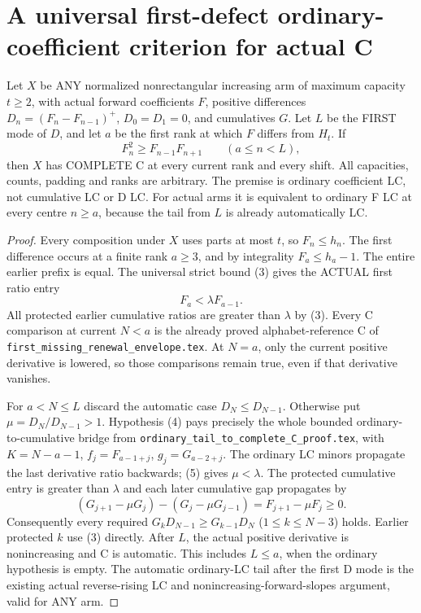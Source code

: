\section{A universal first-defect ordinary-coefficient criterion for actual C}
\begin{theorem}
Let $X$ be ANY normalized nonrectangular increasing arm of maximum
capacity $t\ge2$, with actual forward coefficients $F$, positive
differences $D_n=(F_n-F_{n-1})^+$, $D_0=D_1=0$, and cumulatives
$G$. Let $L$ be the FIRST mode of $D$, and let $a$ be the first
rank at which $F$ differs from $H_t$. If
\[
 F_n^2\ge F_{n-1}F_{n+1}\qquad(a\le n<L),       \tag{4}
\]
then $X$ has COMPLETE C at every current rank and every shift.
All capacities, counts, padding and ranks are arbitrary. The
premise is ordinary coefficient LC, not cumulative LC or D LC.
For actual arms it is equivalent to ordinary F LC at every centre
$n\ge a$, because the tail from $L$ is already automatically LC.
\end{theorem}
\begin{proof}
Every composition under $X$ uses parts at most $t$, so $F_n\le h_n$.
The first difference occurs at a finite rank $a\ge3$, and by
integrality $F_a\le h_a-1$. The entire earlier prefix is equal.
The universal strict bound (3) gives the ACTUAL first ratio entry
\[
                  F_a<\lambda F_{a-1}.         \tag{5}
\]
All protected earlier cumulative ratios are greater than $\lambda$
by (3). Every C comparison at current $N<a$ is the already proved
alphabet-reference C of \texttt{first\_missing\_renewal\_envelope.tex}.
At $N=a$, only the current positive derivative is lowered, so
those comparisons remain true, even if that derivative vanishes.

For $a<N\le L$ discard the automatic case $D_N\le D_{N-1}$.
Otherwise put $\mu=D_N/D_{N-1}>1$. Hypothesis (4) pays precisely
the whole bounded ordinary-to-cumulative bridge from
\texttt{ordinary\_tail\_to\_complete\_C\_proof.tex}, with
$K=N-a-1$, $f_j=F_{a-1+j}$, $g_j=G_{a-2+j}$.
The ordinary LC minors propagate the last derivative ratio
backwards; (5) gives $\mu<\lambda$.
The protected cumulative entry is greater than $\lambda$ and
each later cumulative gap propagates by
\[
 (G_{j+1}-\mu G_j)-(G_j-\mu G_{j-1})
                              =F_{j+1}-\mu F_j\ge0.
\]
Consequently every required $G_kD_{N-1}\ge G_{k-1}D_N$
($1\le k\le N-3$) holds. Earlier protected $k$ use (3) directly.
After $L$, the actual positive derivative is nonincreasing and
C is automatic. This includes $L\le a$, when the ordinary
hypothesis is empty. The automatic ordinary-LC tail after the
first D mode is the existing actual reverse-rising LC and
nonincreasing-forward-slopes argument, valid for ANY arm.
\end{proof}

